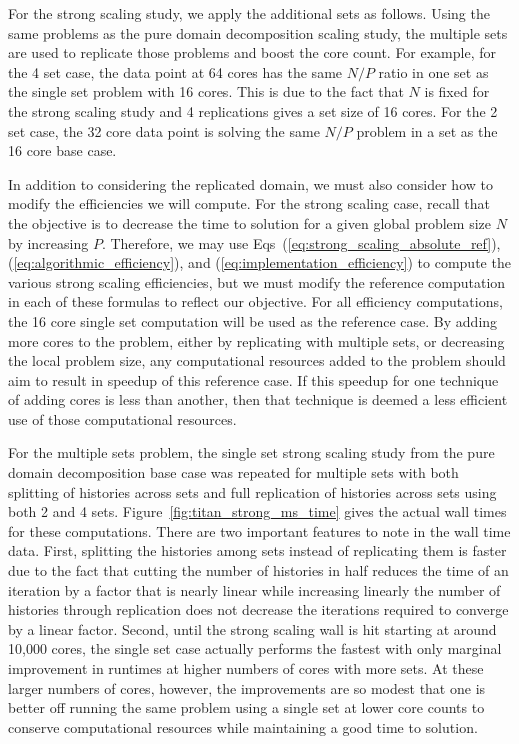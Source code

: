 For the strong scaling study, we apply the additional sets as
follows. Using the same problems as the pure domain decomposition
scaling study, the multiple sets are used to replicate those problems
and boost the core count. For example, for the 4 set case, the data
point at 64 cores has the same $N/P$ ratio in one set as the single
set problem with 16 cores. This is due to the fact that $N$ is fixed
for the strong scaling study and 4 replications gives a set size of 16
cores. For the 2 set case, the 32 core data point is solving the same
$N/P$ problem in a set as the 16 core base case.

In addition to considering the replicated domain, we must also
consider how to modify the efficiencies we will compute. For the
strong scaling case, recall that the objective is to decrease the time
to solution for a given global problem size $N$ by increasing
$P$. Therefore, we may use Eqs~(\ref{eq:strong_scaling_absolute_ref}),
(\ref{eq:algorithmic_efficiency}), and
(\ref{eq:implementation_efficiency}) to compute the various strong
scaling efficiencies, but we must modify the reference computation in
each of these formulas to reflect our objective. For all efficiency
computations, the 16 core single set computation will be used as the
reference case. By adding more cores to the problem, either by
replicating with multiple sets, or decreasing the local problem size,
any computational resources added to the problem should aim to result
in speedup of this reference case. If this speedup for one technique
of adding cores is less than another, then that technique is deemed a
less efficient use of those computational resources.

For the multiple sets problem, the single set strong scaling study
from the pure domain decomposition base case was repeated for multiple
sets with both splitting of histories across sets and full replication
of histories across sets using both 2 and 4
sets. Figure~\ref{fig:titan_strong_ms_time} gives the actual wall
times for these computations. There are two important features to note
in the wall time data. First, splitting the histories among sets
instead of replicating them is faster due to the fact that cutting the
number of histories in half reduces the time of an iteration by a
factor that is nearly linear while increasing linearly the number of
histories through replication does not decrease the iterations
required to converge by a linear factor. Second, until the strong
scaling wall is hit starting at around 10,000 cores, the single set
case actually performs the fastest with only marginal improvement in
runtimes at higher numbers of cores with more sets. At these larger
numbers of cores, however, the improvements are so modest that one is
better off running the same problem using a single set at lower core
counts to conserve computational resources while maintaining a good
time to solution.

